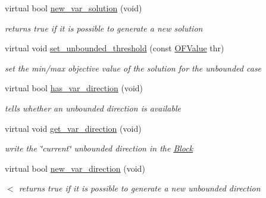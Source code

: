 \begin{Indent}
\begin{DoxyCompactItemize}
virtual bool \mbox{\hyperlink{class_s_m_spp__di__unipi__it_1_1_solver_af109b504a566c90a4ea45c1574c128fe}{new\+\_\+var\+\_\+solution}} (void)
\begin{DoxyCompactList}\small\item\em returns true if it is possible to generate a new solution \end{DoxyCompactList}\item 
virtual void \mbox{\hyperlink{class_s_m_spp__di__unipi__it_1_1_solver_ae1717d1363782e086aa797e7437c0352}{set\+\_\+unbounded\+\_\+threshold}} (const \mbox{\hyperlink{class_s_m_spp__di__unipi__it_1_1_solver_ab8ce6bff9c21fdcd41e355167209301a}{O\+F\+Value}} thr)
\begin{DoxyCompactList}\small\item\em set the min/max objective value of the solution for the unbounded case \end{DoxyCompactList}\item 
virtual bool \mbox{\hyperlink{class_s_m_spp__di__unipi__it_1_1_solver_a27e8c876f577289e523ebf26aeeb977a}{has\+\_\+var\+\_\+direction}} (void)
\begin{DoxyCompactList}\small\item\em tells whether an unbounded direction is available \end{DoxyCompactList}\item 
virtual void \mbox{\hyperlink{class_s_m_spp__di__unipi__it_1_1_solver_a4bc119810c0c2ee3ba0c48183f50aaf4}{get\+\_\+var\+\_\+direction}} (void)
\begin{DoxyCompactList}\small\item\em write the \char`\"{}current\char`\"{} unbounded direction in the \mbox{\hyperlink{class_s_m_spp__di__unipi__it_1_1_block}{Block}} \end{DoxyCompactList}\item 
virtual bool \mbox{\hyperlink{class_s_m_spp__di__unipi__it_1_1_solver_a673fc1c81a1fc86e55dfab3a37f303bc}{new\+\_\+var\+\_\+direction}} (void)
\begin{DoxyCompactList}\small\item\em $<$ returns true if it is possible to generate a new unbounded direction \end{DoxyCompactList}\end{DoxyCompactItemize}
\end{Indent}
